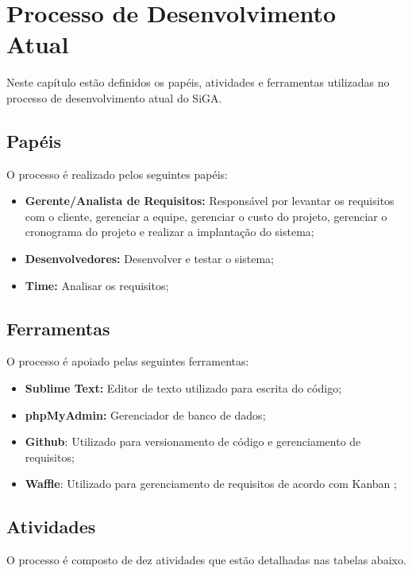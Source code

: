 \chapter{Processo de Desenvolvimento Atual}
\label{ap:processo_atual}

Neste capítulo estão definidos os papéis, atividades e ferramentas utilizadas no processo de desenvolvimento atual do SiGA.

\section*{Papéis}

O processo é realizado pelos seguintes papéis:

\begin{itemize}
 \item \textbf{Gerente/Analista de Requisitos:} Responsável por levantar os requisitos com o cliente, gerenciar a equipe, gerenciar o custo do projeto, 
 gerenciar o cronograma do projeto e realizar a implantação do sistema;
 \item \textbf{Desenvolvedores:} Desenvolver e testar o sistema;
 \item \textbf{Time:} Analisar os requisitos;
\end{itemize}

\section*{Ferramentas}

O processo é apoiado pelas seguintes ferramentas:

\begin{itemize}
 \item \textbf{Sublime Text:} Editor de texto utilizado para escrita do código; 
 \item \textbf{phpMyAdmin:} Gerenciador de banco de dados;
 \item \textbf{Github}: Utilizado para versionamento de código e gerenciamento de requisitos;
 \item \textbf{Waffle}: Utilizado para gerenciamento de requisitos de acordo com Kanban \cite{kanban};
\end{itemize}

\section*{Atividades}

O processo é composto de dez atividades que estão detalhadas nas tabelas abaixo.

